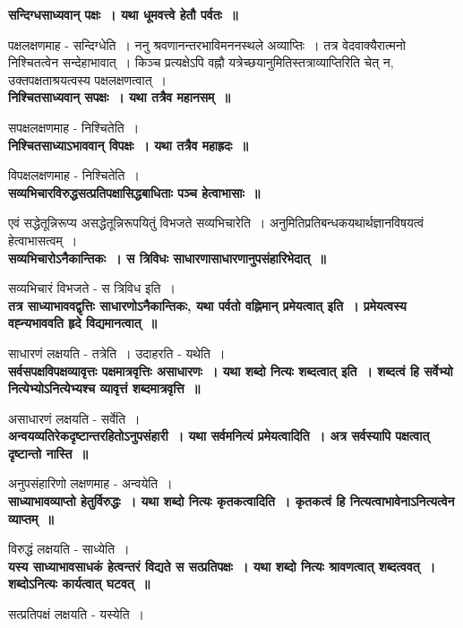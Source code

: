 {\bfseries सन्दिग्धसाध्यवान् पक्षः~। यथा धूमवत्त्वे हेतौ पर्वतः~॥}\par
	पक्षलक्षणमाह - सन्दिग्धेति~। ननु श्रवणानन्तरभाविमननस्थले अव्याप्तिः~। तत्र वेदवाक्यैरात्मनो निश्चितत्वेन सन्देहाभावात्~। किञ्च प्रत्यक्षेऽपि वह्नौ यत्रेच्छयानुमितिस्तत्राव्याप्तिरिति चेत् न, उक्तपक्षताश्रयत्वस्य पक्षलक्षणत्वात्~।\\[10pt]
{\bfseries निश्चितसाध्यवान् सपक्षः~। यथा तत्रैव महानसम्~॥}\par
	सपक्षलक्षणमाह - निश्चितेति~।\\[10pt]
{\bfseries निश्चितसाध्याऽभाववान् विपक्षः~। यथा तत्रैव महाह्रदः~॥}\par
	विपक्षलक्षणमाह - निश्चितेति~।\\[10pt]
{\bfseries सव्यभिचारविरुद्धसत्प्रतिपक्षासिद्धबाधिताः पञ्च हेत्वाभासाः~॥}\par
	एवं सद्धेतून्निरूप्य असद्धेतून्निरूपयितुं विभजते सव्यभिचारेति~। अनुमितिप्रतिबन्धकयथार्थज्ञानविषयत्वं हेत्वाभासत्वम्~।\\[10pt]
{\bfseries सव्यभिचारोऽनैकान्तिकः~। स त्रिविधः साधारणासाधारणानुपसंहारिभेदात्~॥}\par
	सव्यभिचारं विभजते - स त्रिविध इति~।\\[10pt]
{\bfseries तत्र साध्याभाववद्वृत्तिः साधारणोऽनैकान्तिकः, यथा पर्वतो वह्निमान् प्रमेयत्वात् इति~। प्रमेयत्वस्य वह्न्यभाववति हृदे विद्यमानत्वात्~॥}\par
	साधारणं लक्षयति - तत्रेति~। उदाहरति - यथेति~।\\[10pt]
{\bfseries सर्वसपक्षविपक्षव्यावृत्तः पक्षमात्रवृत्तिः असाधारणः~। यथा शब्दो नित्यः शब्दत्वात् इति~। शब्दत्वं हि सर्वेभ्यो नित्येभ्योऽनित्येभ्यश्च व्यावृत्तं शब्दमात्रवृत्ति~॥}\par
	असाधारणं लक्षयति - सर्वेति~।\\[10pt]
{\bfseries अन्वयव्यतिरेकदृष्टान्तरहितोऽनुपसंहारी~। यथा सर्वमनित्यं प्रमेयत्वादिति~। अत्र सर्वस्यापि पक्षत्वात् दृष्टान्तो नास्ति~॥}\par
	अनुपसंहारिणो लक्षणमाह - अन्वयेति~।\\[10pt]
{\bfseries साध्याभावव्याप्तो हेतुर्विरुद्धः~। यथा शब्दो नित्यः कृतकत्वादिति~। कृतकत्वं हि नित्यत्वाभावेनाऽनित्यत्वेन व्याप्तम्~॥}\par
	विरुद्धं लक्षयति - साध्येति~।\\[10pt]
{\bfseries यस्य साध्याभावसाधकं हेत्वन्तरं विद्यते स सत्प्रतिपक्षः~। यथा शब्दो नित्यः श्रावणत्वात् शब्दत्ववत्~। शब्दोऽनित्यः कार्यत्वात् घटवत्~॥}\par
	सत्प्रतिपक्षं लक्षयति - यस्येति~।\\[10pt]
